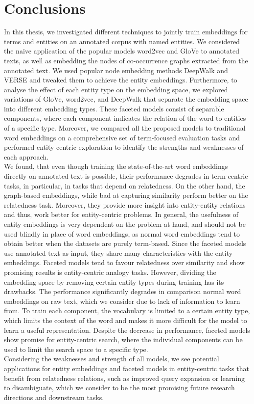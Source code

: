 \chapter{Conclusions}\label{chap:concl}

In this thesis, we investigated different techniques to jointly train embeddings for terms and entities on an annotated corpus with named entities. We considered the naive application of the popular models word2vec and GloVe to annotated texts, as well as embedding the nodes of co-occurrence graphs extracted from the annotated text. We used popular node embedding methods DeepWalk and VERSE and tweaked them to achieve the entity embeddings. Furthermore, to analyse the effect of each entity type on the embedding space, we explored variations of GloVe, word2vec, and DeepWalk that separate the embedding space into different embedding types. These faceted models consist of separable components, where each component indicates the relation of the word to entities of a specific type. Moreover, we compared all the proposed models to traditional word embeddings on a comprehensive set of term-focused evaluation tasks and performed entity-centric exploration to identify the strengths and weaknesses of each approach. \\
We found, that even though training the state-of-the-art word embeddings directly on annotated text is possible, their performance degrades in term-centric tasks, in particular, in tasks that depend on relatedness. On the other hand, the graph-based embeddings, while bad at capturing similarity perform better on the relatedness task. Moreover, they provide more insight into entity-entity relations and thus, work better for entity-centric problems. In general, the usefulness of entity embeddings is very dependent on the problem at hand, and should not be used blindly in place of word embeddings, as normal word embeddings tend to obtain better when the datasets are purely term-based. Since the faceted models use annotated text as input, they share many characteristics with the entity embeddings. Faceted models tend to favour relatedness over similarity and show promising results is entity-centric analogy tasks. However, dividing the embedding space by removing certain entity types during training has its drawbacks. The performance significantly degrades in comparison normal word embeddings on raw text, which we consider due to lack of information to learn from. To train each component, the vocabulary is limited to a certain entity type, which limits the context of the word and makes it more difficult for the model to learn a useful representation. Despite the decrease in performance, faceted models show promise for entity-centric search, where the individual components can be used to limit the search space to a specific type. \\
Considering the weaknesses and strength of all models, we see potential applications for entity embeddings and faceted models in entity-centric tasks that benefit from relatedness relations, such as improved query expansion or learning to disambiguate, which we consider to be the most promising future research directions and downstream tasks.\\